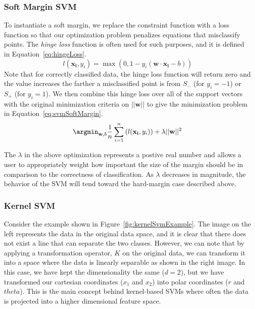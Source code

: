 \subsubsection{Soft Margin SVM}

To instantiate a soft margin, we replace the constraint function with a loss function so that our optimization problem penalizes equations that misclassify points.
%
The \emph{hinge loss} function is often used for such purposes, and it is defined in Equation~\ref{eq:hingeLoss}.
%
\begin{equation}
l(\mathbf{x_i},y_i) = \max(0,1-y_i(\mathbf{w} \cdot \mathbf{x_i} - b))
\label{eq:hingeLoss}
\end{equation}
%
Note that for correctly classified data, the hinge loss function will return zero and the value increases the farther a misclassified point is from $S_-$ (for $y_i=-1$) or $S_+$ (for $y_i=1$).
%
We then combine this hinge loss over all of the support vectors with the original minimization criteria on $||\mathbf{w}||$ to give the minimization problem in Equation~\ref{eq:svmSoftMargin}.
\begin{equation}
\argmin_{\mathbf{w},b}\frac{1}{n}\sum_{i=1}^n \left(l(\mathbf{x_i},y_i)\right) + \lambda ||\mathbf{w}||^2
\label{eq:svmSoftMargin}
\end{equation}

The $\lambda$ in the above optimization represents a postive real number and allows a user to appropriately weight how important the size of the margin should be in comparison to the correctness of classification.
%
As $\lambda$ decreases in magnitude, the behavior of the SVM will tend toward the hard-margin case described above.

\subsubsection{Kernel SVM}

Consider the example shown in Figure~\ref{fig:kernelSvmExample}.
%
The image on the left represents the data in the original data space, and it is clear that there does not exist a line that can separate the two classes.
%
However, we can note that by applying a transformation operator, $K$ on the original data, we can transform it into a space where the data is linearly separable as shown in the right image.
%
In this case, we have kept the dimensionality the same ($d=2$), but we have transformed our cartesian coordinates ($x_1$ and $x_2$) into polar coordinates ($r$ and $theta$).
%
This is the main concept behind kernel-based SVMs where often the data is projected into a higher dimensional feature space.


